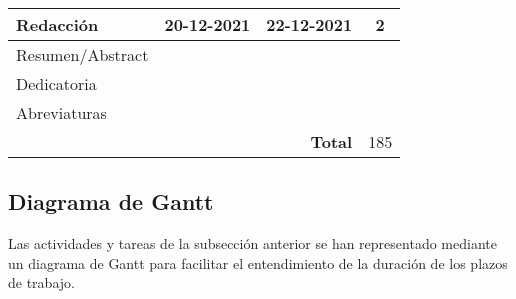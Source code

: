\begin{longtable}[c]{lcc|c|}
	\multicolumn{1}{|l|}{\textbf{Redacción}}            & \multicolumn{1}{c|}{20-12-2021} & 22-12-2021                          & 2   \\ \hline
	\multicolumn{1}{|l|}{Resumen/Abstract}              & \multicolumn{1}{c|}{}           &                                     &     \\ \hline
	\multicolumn{1}{|l|}{Dedicatoria}                   & \multicolumn{1}{c|}{}           &                                     &     \\ \hline
	\multicolumn{1}{|l|}{Abreviaturas}                  & \multicolumn{1}{c|}{}           &                                     &     \\ \hline
	                                                    & \multicolumn{1}{l}{}            & \multicolumn{1}{r|}{\textbf{Total}} & 185 \\ \cline{4-4}
\end{longtable}

\subsection{Diagrama de Gantt}
Las actividades y tareas de la subsección anterior se han representado mediante un diagrama de Gantt para facilitar el entendimiento de la duración de los plazos de trabajo.

